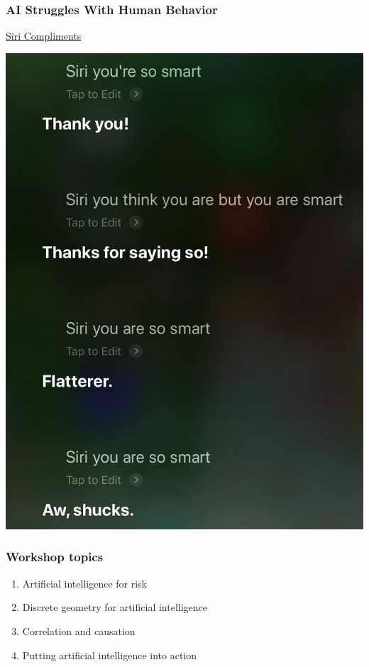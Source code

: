\begin{frame}
\frametitle{AI Struggles With Human Behavior}
\href{run:graphics/siri_smart_sarcasm.m4a}{Siri Compliments}

\begin{center}
\includegraphics[height=0.7\textheight]{graphics/siri_transcript}
\end{center}
\end{frame}

\begin{frame}
\frametitle{Workshop topics}
\begin{enumerate}
\item Artificial intelligence for risk
\item Discrete geometry for artificial intelligence
\item Correlation and causation
\item Putting artificial intelligence into action
\end{enumerate}
\end{frame}

